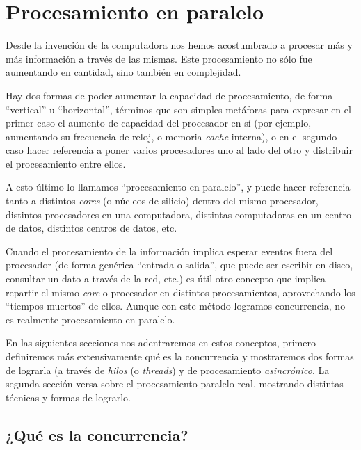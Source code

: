 

\chapter{Procesamiento en paralelo} \label{ch:proc_paralelo}

Desde la invención de la computadora nos hemos acostumbrado a procesar más y más información a través de las mismas. Este procesamiento no sólo fue aumentando en cantidad, sino también en complejidad. 

Hay dos formas de poder aumentar la capacidad de procesamiento, de forma ``vertical'' u ``horizontal'', términos que son simples metáforas para expresar en el primer caso el aumento de capacidad del procesador en sí (por ejemplo, aumentando su frecuencia de reloj, o memoria \textit{cache} interna), o en el segundo caso hacer referencia a poner varios procesadores uno al lado del otro y distribuir el procesamiento entre ellos.

A esto último lo llamamos ``procesamiento en paralelo'', y puede hacer referencia tanto a distintos \textit{cores} (o núcleos de silicio) dentro del mismo procesador, distintos procesadores en una computadora, distintas computadoras en un centro de datos, distintos centros de datos, etc.

Cuando el procesamiento de la información implica esperar eventos fuera del procesador (de forma genérica ``entrada o salida'', que puede ser escribir en disco, consultar un dato a través de la red, etc.) es útil otro concepto que implica repartir el mismo \textit{core} o procesador en distintos procesamientos, aprovechando los ``tiempos muertos'' de ellos. Aunque con este método logramos concurrencia, no es realmente procesamiento en paralelo.

En las siguientes secciones nos adentraremos en estos conceptos, primero definiremos más extensivamente qué es la concurrencia y mostraremos dos formas de lograrla (a través de \textit{hilos} (o \textit{threads}) y de procesamiento \textit{asincrónico}. La segunda sección versa sobre el procesamiento paralelo real, mostrando distintas técnicas y formas de lograrlo.


\section{¿Qué es la concurrencia?}\label{sec:concurrencia}

